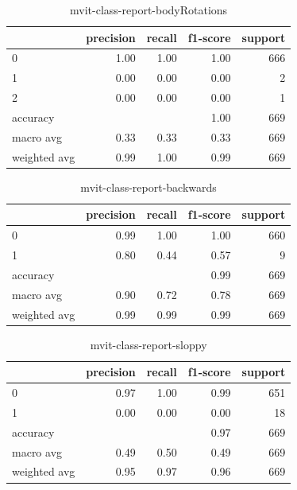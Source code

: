 \begin{table}[h!]
    \begin{tabular}{|l|r|r|r|r|}
                \hline & precision &   recall & f1-score &  support \\ \hline
                0 &      1.00 &      1.00 &     1.00 &      666 \\
                1 &      0.00 &      0.00 &     0.00 &        2 \\
                2 &      0.00 &      0.00 &     0.00 &        1 \\ \hline
         accuracy &           &           &     1.00 &      669 \\
        macro avg &      0.33 &      0.33 &     0.33 &      669 \\
     weighted avg &      0.99 &      1.00 &     0.99 &      669 \\

         \hline
    \end{tabular}
    \caption{mvit-class-report-bodyRotations}
    \label{tbl:mvit-class-report-bodyRotations}
\end{table}

\begin{table}[h!]
    \begin{tabular}{|l|r|r|r|r|}
                \hline & precision &   recall & f1-score &  support \\ \hline
                0 &       0.99 &     1.00 &     1.00 &      660 \\
                1 &       0.80 &     0.44 &     0.57 &        9 \\ \hline
         accuracy &            &          &     0.99 &      669 \\
        macro avg &       0.90 &     0.72 &     0.78 &      669 \\
     weighted avg &       0.99 &     0.99 &     0.99 &      669 \\
         \hline
    \end{tabular}
    \caption{mvit-class-report-backwards}
    \label{tbl:mvit-class-report-backwards}
\end{table}

\begin{table}[h!]
    \begin{tabular}{|l|r|r|r|r|}
                \hline & precision &   recall & f1-score &  support \\ \hline
                0 &      0.97 &     1.00 &     0.99 &      651 \\
                1 &      0.00 &     0.00 &     0.00 &       18 \\
         accuracy &           &          &     0.97 &      669 \\ \hline
        macro avg &      0.49 &     0.50 &     0.49 &      669 \\
     weighted avg &      0.95 &     0.97 &     0.96 &      669 \\
         \hline
    \end{tabular}
    \caption{mvit-class-report-sloppy}
    \label{tbl:mvit-class-report-sloppy}
\end{table}

